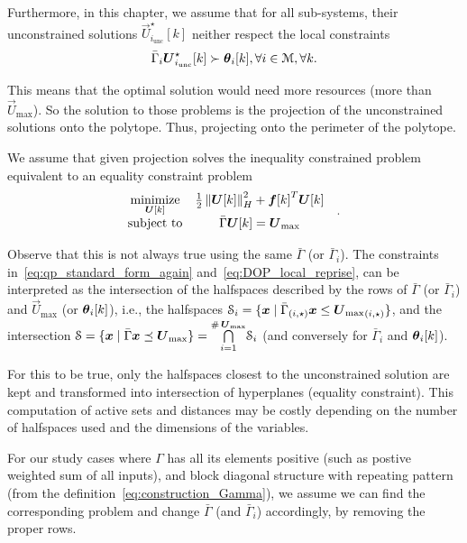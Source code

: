 \documentclass[../main.tex]{subfiles}
\begin{document}
Furthermore, in this chapter, we assume that for all sub-systems, their unconstrained solutions $\vec{U}_{i_{\text{unc}}}^{\star}[k]$ neither respect the local constraints
\begin{equation}
\bar{\Gamma}_{i}\vec{U}_{i_{\text{unc}}}^{\star}[k]\succ \thetaik, \forall i\in\set{M}, \forall k.
\end{equation}

This means that the optimal solution would need more resources (more than $\vec{U}_{\max}$).
So the solution to those \qp{} problems is the projection of the unconstrained solutions onto the polytope. Thus, projecting onto the perimeter of the polytope.

We assume that given projection solves the inequality constrained problem equivalent to an equality constraint problem
\begin{equation}
  \label{eq:qp_standard_form_equality}
  \begin{aligned}
    \begin{matrix}
      \minimize\limits_{\vec{U}[k]} &
                                                 \frac{1}{2}\norm{\vec{U}[k]}^{2}_{H} + {\vec{f}[k]}^{T}\vec{U}[k] &\\
      \mathrm{subject~ to} &
                             \bar{\Gamma}\vec{U}[k]= {\vec{U}}_{\text{max}}
    \end{matrix}
  \end{aligned}.
\end{equation}

\begin{remark}
  Observe that this is not always true using the same $\bar{\Gamma}$ (or $\bar{\Gamma}_{i}$).
  The constraints in~\eqref{eq:qp_standard_form_again} and~\eqref{eq:DOP_local_reprise}, can be interpreted as the intersection of the halfspaces described by the rows of $\bar{\Gamma}$ (or $\bar{\Gamma}_{i}$) and $\vec{U}_{\max}$ (or $\thetaik$), i.e., the halfspaces
  ${\set{S}_i=\setbuild{\vec{x}}{\elem[i,\star]{{\bar{\Gamma}}}\vec{x}\leq\elem[i,\star]{\vec{U}_{\max}}}}$, and the intersection ${\set{S}=\setbuild{\vec{x}}{\bar{\Gamma}\vec{x}\preceq\vec{U}_{\max}}=\bigcap\limits_{i=1}^{\card\vec{U}_{\max}}}\set{S}_{i}$ (and conversely for $\bar{\Gamma}_{i}$ and $\thetaik$).

  For this to be true, only the halfspaces closest to the unconstrained solution are kept and transformed into intersection of hyperplanes (equality constraint).
  This computation of active sets and distances may be costly depending on the number of halfspaces used and the dimensions of the variables.

  For our study cases where $\Gamma$ has all its elements positive (such as postive weighted sum of all inputs), and block diagonal structure with repeating pattern (from the \mpc{} definition~\eqref{eq:construction_Gamma}), we assume we can find the corresponding problem and change $\bar{\Gamma}$ (and $\bar{\Gamma}_i$) accordingly, by removing the proper rows.
\end{remark}
\end{document}
